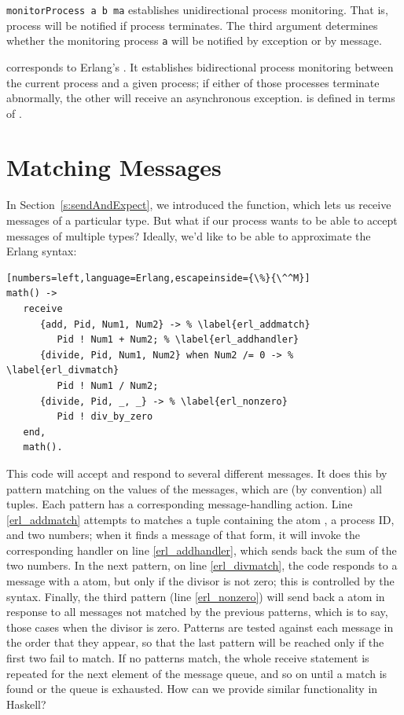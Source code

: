 \documentclass[preprint]{sigplanconf}
\begin{document}
\noindent
\lstinline!monitorProcess a b ma! establishes unidirectional process monitoring. That is, process  will be notified if process  terminates. The third argument determines whether the monitoring process \texttt{a} will be notified by exception or by message.

 corresponds to Erlang's . It establishes bidirectional process monitoring between the current process and a given process; if either of those processes terminate abnormally, the other will receive an asynchronous exception.  is defined in terms of . 

\section{Matching Messages}
\label{s:matching}

In Section~\ref{s:sendAndExpect}, we introduced the  function, which lets us receive messages of a particular type. But what if our process wants to be able to accept messages of multiple types? Ideally, we'd like to be able to approximate the Erlang  syntax:
\begin{lstlisting}[numbers=left,language=Erlang,escapeinside={\%}{\^^M}]
math() ->
   receive
      {add, Pid, Num1, Num2} -> % \label{erl_addmatch}
         Pid ! Num1 + Num2; % \label{erl_addhandler}
      {divide, Pid, Num1, Num2} when Num2 /= 0 -> % \label{erl_divmatch}
         Pid ! Num1 / Num2;
      {divide, Pid, _, _} -> % \label{erl_nonzero}
         Pid ! div_by_zero
   end,
   math().
\end{lstlisting}

This code will accept and respond to several different messages. It does this by pattern matching on the values of the messages, which are (by convention) all tuples. Each pattern has a corresponding message-handling action. 
Line \ref{erl_addmatch} attempts to matches a tuple containing the atom , a process ID, and two numbers; when it finds a message of that form, it will invoke the corresponding handler on line \ref{erl_addhandler}, which sends back the sum of the two numbers. 
In the next pattern, on line \ref{erl_divmatch}, the code responds to a message with a  atom, but only if the divisor is not zero; this is controlled by the  syntax. 
Finally, the third pattern (line \ref{erl_nonzero}) will send back a  atom in response to all messages not matched by the previous patterns, which is to say, those cases when the divisor is zero.
Patterns are tested against each message in the order that they appear, so that the last pattern will be reached only if the first two fail to match.
If no patterns match, the whole receive statement is repeated for the next element of the message queue, and so on until a match is found or the queue is exhausted.
How can we provide similar functionality in Haskell?
\end{document}
